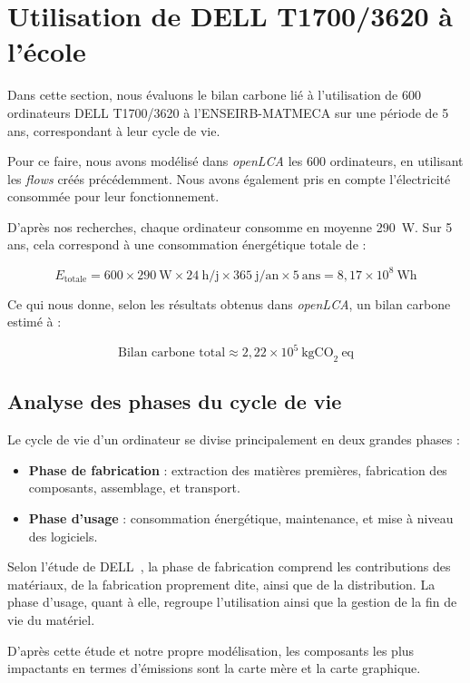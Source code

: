 \section{Utilisation de DELL T1700/3620 à l'école}

Dans cette section, nous évaluons le bilan carbone lié à l'utilisation de 600 ordinateurs DELL T1700/3620 à l'ENSEIRB-MATMECA sur une période de 5 ans, correspondant à leur cycle de vie.

Pour ce faire, nous avons modélisé dans \textit{openLCA} les 600 ordinateurs, en utilisant les \textit{flows} créés précédemment. Nous avons également pris en compte l’électricité consommée pour leur fonctionnement.

D'après nos recherches, chaque ordinateur consomme en moyenne 290~W. Sur 5 ans, cela correspond à une consommation énergétique totale de :

\[
E_{\text{totale}} = 600 \times 290~\text{W} \times 24~\text{h/j} \times 365~\text{j/an} \times 5~\text{ans} = 8{,}17 \times 10^8~\text{Wh}
\]

Ce qui nous donne, selon les résultats obtenus dans \textit{openLCA}, un bilan carbone estimé à :

\[
\text{Bilan carbone total} \approx 2{,}22 \times 10^5~\text{kgCO}_2~\text{eq}
\]

\subsection{Analyse des phases du cycle de vie}

Le cycle de vie d’un ordinateur se divise principalement en deux grandes phases :

\begin{itemize}
    \item \textbf{Phase de fabrication} : extraction des matières premières, fabrication des composants, assemblage, et transport.
    \item \textbf{Phase d’usage} : consommation énergétique, maintenance, et mise à niveau des logiciels.
\end{itemize}

Selon l’étude de DELL~\citep{dell2018carbon}, la phase de fabrication comprend les contributions des matériaux, de la fabrication proprement dite, ainsi que de la distribution. La phase d’usage, quant à elle, regroupe l'utilisation ainsi que la gestion de la fin de vie du matériel.

D’après cette étude et notre propre modélisation, les composants les plus impactants en termes d’émissions sont la carte mère et la carte graphique.

